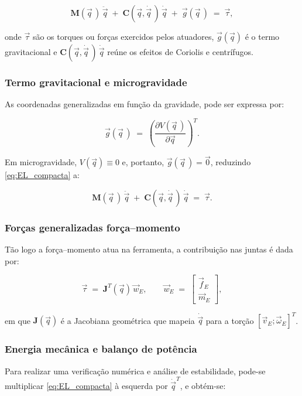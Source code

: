 \begin{equation}
\label{eq:EL_compacta}
\mathbf M(\vec q\,)\,\ddot{\vec q} \;+\; \mathbf C(\vec q,\dot{\vec q}\,)\,\dot{\vec q} \;+\; \vec g(\vec q\,)
\;=\;
\vec \tau,
\end{equation}

onde $\vec\tau$ são os torques ou forças exercidos pelos atuadores,
$\vec g(\vec q)$ é o termo gravitacional e
$\mathbf C(\vec q,\dot{\vec q}\,)\,\dot{\vec q}$ reúne os efeitos de Coriolis e centrífugos.

\subsubsection{Termo gravitacional e microgravidade}
As coordenadas generalizadas em função da gravidade, pode ser expressa por:

\begin{equation}
\vec g(\vec q\,)
\;=\;
\left(\frac{\partial V(\vec q\,)}{\partial \vec q}\right)^T.
\label{eq:g_def}
\end{equation}

Em microgravidade,
$V(\vec q)\equiv 0$ e,
portanto, $\vec g(\vec q\,)=\vec 0$, reduzindo \eqref{eq:EL_compacta} a:

\begin{equation}
\label{eq:EL_microgravidade}
\mathbf M(\vec q\,)\,\ddot{\vec q}
\;+\;
\mathbf C(\vec q,\dot{\vec q}\,)\,\dot{\vec q}
\;=\;
\vec \tau.
\end{equation}

\subsubsection{Forças generalizadas força--momento}
Tão logo a força--momento atua na ferramenta, a contribuição nas juntas é dada por:

\begin{equation}
\label{eq:tau_Jt_w}
\vec \tau
\;=\;
\mathbf J^{T}(\vec q)\,\vec w_{E}, 
\qquad
\vec w_{E} \;=\; \begin{bmatrix}\vec f_{E} \\ \vec m_{E}\end{bmatrix},
\end{equation}

em que $\mathbf J(\vec q)$ é a Jacobiana geométrica
que mapeia $\dot{\vec q}$ para a torção
$[\vec v_{E}; \vec \omega_{E}]^T$.

\subsubsection{Energia mecânica e balanço de potência}
Para realizar uma verificação numérica e análise de estabilidade, pode-se multiplicar
\eqref{eq:EL_compacta} à esquerda por
$\dot{\vec q}^T$, e obtém-se:

